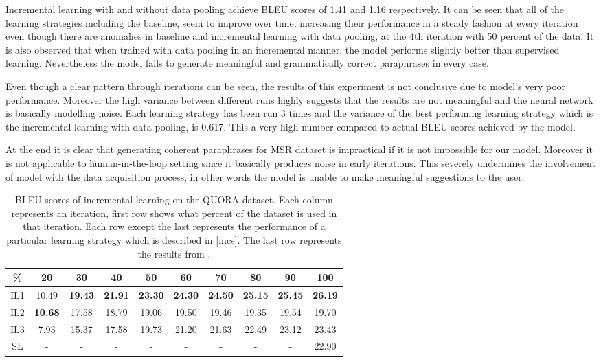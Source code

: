 Incremental learning with and without data pooling achieve BLEU scores of 1.41 and 1.16 respectively. It can be seen that all of the learning strategies including the baseline, seem to improve over time, increasing their performance in a steady fashion at every iteration even though there are anomalies in baseline and incremental learning with data pooling, at the 4th iteration with 50 percent of the data. It is also observed that when trained with data pooling in an incremental manner, the model performs slightly better than supervised learning. Nevertheless the model fails to generate meaningful and grammatically correct paraphrases in every case.

Even though a clear pattern through iterations can be seen, the results of this experiment is not conclusive due to model's very poor performance. Moreover the high variance between different runs highly suggests that the results are not meaningful and the neural network is basically modelling noise. Each learning strategy has been run 3 times and the variance of the best performing learning strategy which is the incremental learning with data pooling, is 0.617. This a very high number compared to actual BLEU scores achieved by the model. 

At the end it is clear that generating coherent paraphrases for MSR dataset is impractical if it is not impossible for our model. Moreover it is not applicable to human-in-the-loop setting since it basically produces noise in early iterations. This severely undermines the involvement of model with the data acquisition process, in other words the model is unable to make meaningful suggestions to the user.

\begin{table}[b]
\centering
\small
 \begin{tabular}{|c | c | c | c | c | c | c | c | c | c |} 
 \hline
 \% & 20 & 30 & 40 & 50 & 60 & 70 & 80 & 90 & 100 \\ [0.5ex] 
 \hline
  IL1 & 10.49 &  \textbf{19.43} & \textbf{21.91} &  \textbf{23.30} &  \textbf{24.30} &  \textbf{24.50} &  \textbf{25.15} &  \textbf{25.45} &  \textbf{26.19}  \\ 
 \hline
  IL2 &  \textbf{10.68} & 17.58 & 18.79 & 19.06 & 19.50 & 19.46 & 19.35 & 19.54 & 19.70 \\ 
 \hline
 IL3 & 7.93 & 15.37 & 17.58 & 19.73 & 21.20 & 21.63 & 22.49 & 23.12 & 23.43 \\ 
 \hline
 SL & - & - & - & - & - & - & - & - & 22.90  \\ 
 \hline
\end{tabular}
\caption{BLEU scores of incremental learning on the QUORA dataset. Each column represents an iteration, first row shows what percent of the dataset is used in that iteration. Each row except the last represents the performance of a particular learning strategy which is described in \ref{incs}. The last row represents the results from \cite{Guptaetal}.} \label{table:incrementalQuora}
\end{table}

